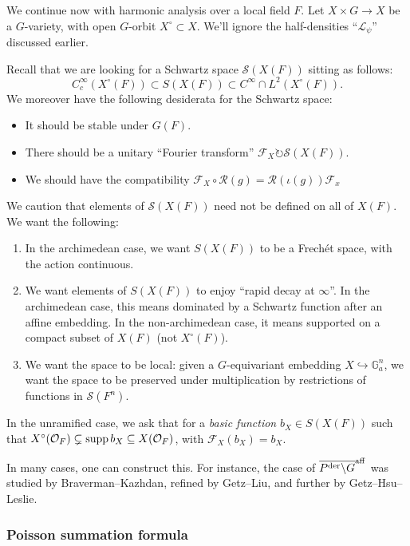 \documentclass[reqno]{amsart} 
\numberwithin{theorem}{section}
\numberwithin{equation}{section}
\numberwithin{exercise}{section}
\begin{document}
We continue now with harmonic analysis over a local field $F$.  Let $X \times G \rightarrow X$ be a $G$-variety, with open $G$-orbit $X^{\circ} \subset X$.  We'll ignore the half-densities ``$\mathcal{L}_\psi$'' discussed earlier.

Recall that we are looking for a Schwartz space $\mathcal{S}(X(F))$ sitting as follows:
\begin{equation*}
  C_c^\infty(X^{\circ}(F)) \subset S(X(F)) \subset C^\infty \cap L^2(X^{\circ}(F)).
\end{equation*}
We moreover have the following desiderata for the Schwartz space:
\begin{itemize}
\item It should be stable under $G(F)$.
\item There should be a unitary ``Fourier transform'' $\mathcal{F}_X \circlearrowright \mathcal{S}(X(F))$.
\item We should have the compatibility $\mathcal{F}_X \circ \mathcal{R}(g) = \mathcal{R}(\iota(g)) \mathcal{F}_x$
\end{itemize}
We caution that elements of $\mathcal{S}(X(F))$ need not be defined on all of $X(F)$.  We want the following:
\begin{enumerate}
\item In the archimedean case, we want $S(X(F))$ to be a Frechét space, with the action continuous.
\item We want elements of $S(X(F))$ to enjoy ``rapid decay at $\infty$''.  In the archimedean case, this means dominated by a Schwartz function after an affine embedding.  In the non-archimedean case, it means supported on a compact subset of $X(F)$ (not $X^{\circ}(F)$).
\item We want the space to be local: given a $G$-equivariant embedding $X \hookrightarrow \mathbb{G}_a^n $, we want the space to be preserved under multiplication by restrictions of functions in $\mathcal{S}(F^n)$.
\end{enumerate}
In the unramified case, we ask that for a \emph{basic function} $b_X \in S(X(F))$ such that $X^{\circ}(\mathcal{O}_F) \subsetneq \operatorname{supp} b_X \subseteq X(\mathcal{O}_F)$, with $\mathcal{F}_X(b_X) = b_X$.

In many cases, one can construct this.  For instance, the case of $\overline{P^{\operatorname{der}} \backslash G}^{\mathrm{aff}}$ was studied by Braverman--Kazhdan, refined by Getz--Liu, and further by Getz--Hsu--Leslie.

\subsubsection{Poisson summation formula}
\end{document}
